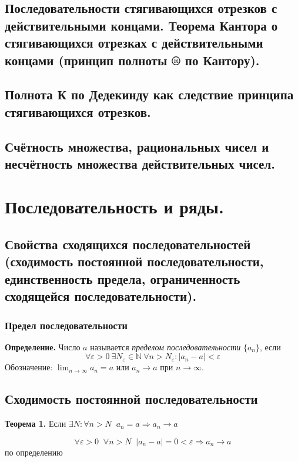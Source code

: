 \documentclass[12pt, a4paper]{article}
\newcommand{\N}{\mathbb{N}}
\newcommand{\eps}{\varepsilon}
\begin{document}
\begin{centering}
\subsection{Последовательности стягивающихся отрезков с действительными концами. Теорема Кантора о стягивающихся отрезках с действительными концами (принцип полноты ® по Кантору).}

\subsection{Полнота К по Дедекинду как следствие принципа стягивающихся отрезков.}

\subsection{Счётность множества, рациональных чисел и несчётность множества действительных чисел.}



\section{Последовательность и ряды.}

\subsection{Свойства сходящихся последовательностей (сходимость постоянной последовательности, единственность предела, ограниченность сходящейся последовательности).}

\subsubsection{Предел последовательности}
\begin{tcolorbox}
\textbf{Определение.} Число $a$ называется \textit{пределом последовательности} $\{a_n\}$, если
$$\forall \eps > 0\ \exists N_\eps \in \N\ \forall n > N_\eps: |a_n - a| < \eps$$
Обозначение: $\lim_{n\to\infty} a_n = a$ или $a_n \to a$ при $n \to \infty$.
\end{tcolorbox}

\subsection{Сходимость постоянной последовательности}
\begin{tcolorbox}
    \textbf{Теорема 1.} Если $\exists N: \forall n > N \;\; a_n = a \Rightarrow a_n\to a$
\end{tcolorbox}
\begin{tcolorbox}[title=Доказательство]
    \[ \forall \varepsilon>0 \;\;\forall n>N \;\; |a_n - a| = 0 < \varepsilon \Rightarrow a_n\to a\] по определению 
\end{tcolorbox}


\end{centering}
\end{document}
